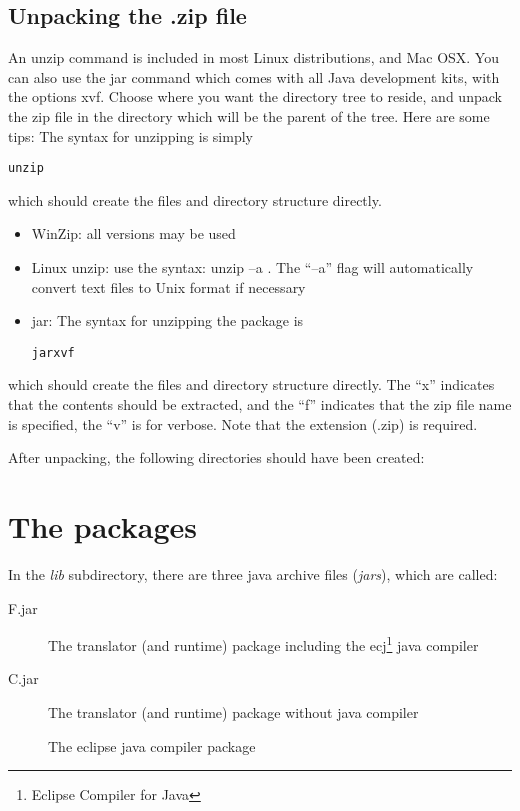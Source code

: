\subsection{Unpacking the \nr{}.zip file} 
An unzip command is included in most Linux distributions, and Mac
OSX. You can also use the jar command which comes with all Java
development kits, with the options xvf.
Choose where you want the \nr{} directory tree to reside, and unpack the zip file in the directory which will be the parent of the \nr{} tree. Here are some tips: 
The syntax for unzipping \nrpackagename{} is simply
\begin{alltt}
        unzip \nrpackagename{}
\end{alltt}
which should create the files and directory structure directly.
\begin{itemize} 
\item WinZip: all versions may be used
\item Linux unzip: use the syntax: unzip –a \code{\nrpackagename{}}. The “–a” flag will automatically convert text files to Unix format if necessary
\item jar: The syntax for unzipping the package is
\begin{alltt} 
jar xvf \nrpackagename{}
\end{alltt}
\end{itemize}
which should create the files and directory structure directly. The
“x” indicates that the contents should be extracted, and the “f”
indicates that the zip file name is specified, the ``v'' is for verbose. Note that the extension (.zip) is required. 

After unpacking, the following directories should have been created:
\section{The \nr{} packages}
In the \emph{lib} subdirectory, there are three java archive files
(\emph{jars}), which are called:

\begin{description}
\item[\nr{}F.jar] The translator (and runtime) package including the
  ecj\footnote{Eclipse Compiler for Java} java compiler
\item[\nr{}C.jar] The translator (and runtime) package without java
  compiler
\item[\ecjjarname{}] The eclipse java compiler package
\end{description}

